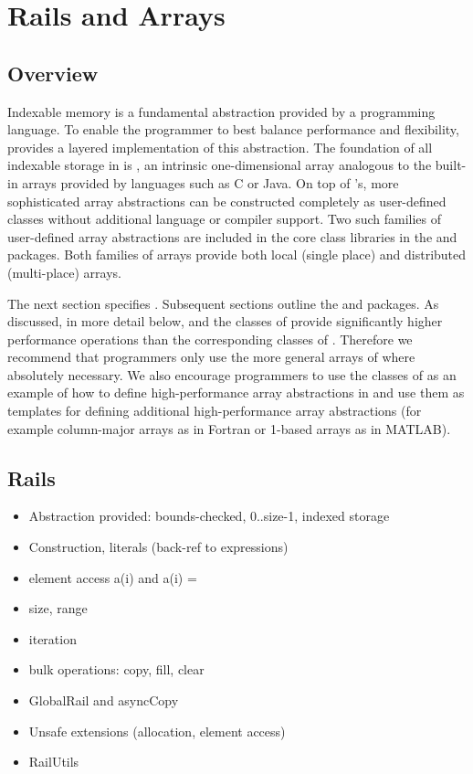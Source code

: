 \chapter{Rails and Arrays}\label{XtenArrays}

\section{Overview}

Indexable memory is a fundamental abstraction provided by a
programming language. To enable the programmer to best balance
performance and flexibility, \Xten{} provides a layered implementation
of this abstraction. The foundation of all indexable storage in
\Xten{} is , an intrinsic one-dimensional array
analogous to the built-in arrays provided by languages such as C or
Java. On top of 's, more sophisticated array abstractions
can be constructed completely as user-defined \Xten{} classes without
additional language or compiler support. Two such families of
user-defined array abstractions are included in the \Xten{} core class
libraries in the  and  packages.
Both families of arrays provide both local (single place) and
distributed (multi-place) arrays. 

The next section specifies .  Subsequent sections outline
the  and  packages.  As discussed,
in more detail below,  and the classes of 
provide significantly higher performance operations than the
corresponding classes of . Therefore we recommend
that programmers only use the more general arrays of
 where absolutely necessary.  We also encourage
programmers to use the classes of  as an example of how
to define high-performance array abstractions in \Xten{} and use them
as templates for defining additional high-performance array
abstractions (for example column-major arrays as in Fortran or 1-based
arrays as in MATLAB).

\section{Rails}

\begin{itemize}
\item Abstraction provided: bounds-checked, 0..size-1, indexed storage
\item Construction, literals (back-ref to expressions)
\item element access a(i) and a(i) = 
\item size, range
\item iteration
\item bulk operations: copy, fill, clear
\item GlobalRail and asyncCopy
\item Unsafe extensions (allocation, element access)
\item RailUtils
\end{itemize}


